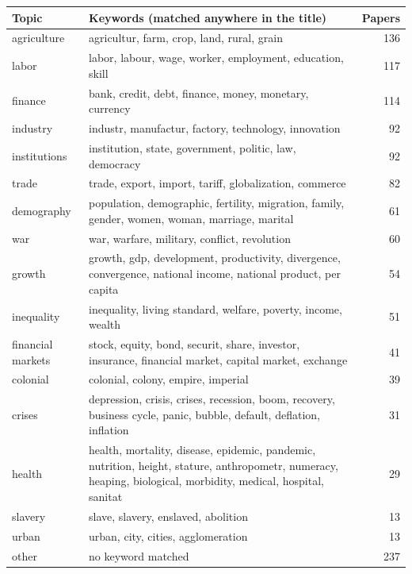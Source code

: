 \begin{tabular}{lp{9cm}r}
\toprule
Topic & Keywords (matched anywhere in the title) & Papers \\
\midrule
agriculture & agricultur, farm, crop, land, rural, grain & 136 \\
labor & labor, labour, wage, worker, employment, education, skill & 117 \\
finance & bank, credit, debt, finance, money, monetary, currency & 114 \\
industry & industr, manufactur, factory, technology, innovation & 92 \\
institutions & institution, state, government, politic, law, democracy & 92 \\
trade & trade, export, import, tariff, globalization, commerce & 82 \\
demography & population, demographic, fertility, migration, family, gender, women, woman, marriage, marital & 61 \\
war & war, warfare, military, conflict, revolution & 60 \\
growth & growth, gdp, development, productivity, divergence, convergence, national income, national product, per capita & 54 \\
inequality & inequality, living standard, welfare, poverty, income, wealth & 51 \\
financial markets & stock, equity, bond, securit, share, investor, insurance, financial market, capital market, exchange & 41 \\
colonial & colonial, colony, empire, imperial & 39 \\
crises & depression, crisis, crises, recession, boom, recovery, business cycle, panic, bubble, default, deflation, inflation & 31 \\
health & health, mortality, disease, epidemic, pandemic, nutrition, height, stature, anthropometr, numeracy, heaping, biological, morbidity, medical, hospital, sanitat & 29 \\
slavery & slave, slavery, enslaved, abolition & 13 \\
urban & urban, city, cities, agglomeration & 13 \\
other & no keyword matched & 237 \\
\bottomrule
\end{tabular}
